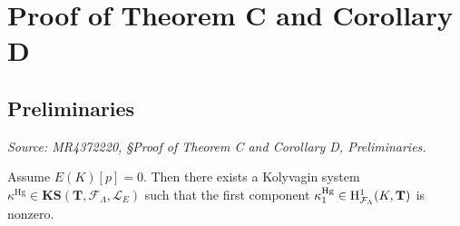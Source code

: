 \section{Proof of Theorem C and Corollary D}

\subsection{Preliminaries}

\begin{theorem}
  \label{thm:howard-HPKS}
  \textit{Source: MR4372220, §Proof of Theorem C and Corollary D, Preliminaries.}

  Assume \(E(K)[p] = 0\). Then there exists a Kolyvagin system \(\kappa^{\mathrm{Hg}} \in \mathbf{KS}(\mathbf{T}, \mathcal{F}_\Lambda, \mathcal{L}_E)\) such that the first component \(\kappa_1^{\mathrm{Hg}} \in \mathrm{H}^1_{\mathcal{F}_\Lambda}(K, \mathbf{T})\) is nonzero.
\end{theorem}

